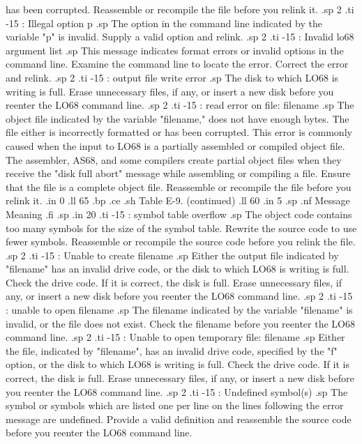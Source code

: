 has been corrupted.  Reassemble or recompile the file before you relink it.
.sp 2
.ti -15
: Illegal option  p
.sp
The option in the command line indicated by the variable "p" is 
invalid.  Supply a valid option and relink.
.sp 2
.ti -15
: Invalid lo68 argument list
.sp
This message indicates format errors or invalid options in the 
command line.  Examine the command line to locate the error.  Correct the 
error and relink.
.sp 2
.ti -15
: output file write error
.sp
The disk to which LO68 is writing is full.  Erase unnecessary files, if any, 
or insert a new disk before you reenter the LO68 command line.
.sp 2
.ti -15
: read error on file:  filename
.sp
The object file indicated by the variable "filename," does not 
have enough bytes.  
The file either is incorrectly formatted or has been corrupted.  This error 
is commonly caused when the input to LO68 is a partially
assembled or compiled object file.  The assembler, AS68, and some 
compilers create partial object files 
when they receive the "disk full abort" message while assembling or 
compiling a file.  Ensure that the file is a complete object file.  
Reassemble or recompile the file before you relink it.  
.in 0
.ll 65
.bp
.ce
.sh
Table E-9.  (continued)
.ll 60
.in 5
.sp
.nf
Message        Meaning
.fi
.sp
.in 20
.ti -15
: symbol table overflow
.sp
The object code contains too many symbols for the size of the 
symbol table.  Rewrite the source code to use fewer symbols.  Reassemble or 
recompile the source code before you relink the file.
.sp 2
.ti -15
: Unable to create  filename
.sp
Either the output file indicated by "filename" has an invalid drive 
code, or the disk to which LO68 is writing is full.  Check the drive code.  
If it is correct, 
the disk is full.  Erase unnecessary files, if any, or insert a new disk
before you reenter the LO68 command line.
.sp 2
.ti -15
: unable to open  filename
.sp
The filename indicated by the variable "filename" is invalid, 
or the file does not exist.  Check the filename before you reenter the LO68 
command line.
.sp 2
.ti -15
: Unable to open temporary file:  filename
.sp
Either the file, indicated by "filename", has an invalid drive 
code, specified by the "f" option, or the disk to which LO68 is writing 
is full.  Check the drive code. If it is correct, the disk is full.  Erase 
unnecessary files, if any, or insert a new disk before you 
reenter the LO68 command line.
.sp 2
.ti -15
: Undefined symbol(s)
.sp
The symbol or symbols which are listed one per line on the lines 
following the error message are undefined.  Provide a valid definition and 
reassemble the source code before you reenter the LO68 command line.
